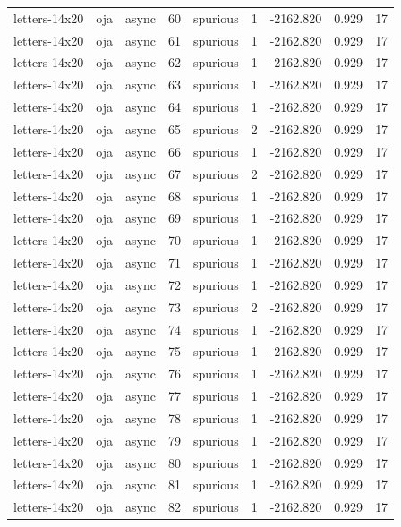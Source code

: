 \begin{tabular}{lllrlrrrr}
letters-14x20 & oja & async & 60 & spurious & 1 & -2162.820 & 0.929 & 17 \\
letters-14x20 & oja & async & 61 & spurious & 1 & -2162.820 & 0.929 & 17 \\
letters-14x20 & oja & async & 62 & spurious & 1 & -2162.820 & 0.929 & 17 \\
letters-14x20 & oja & async & 63 & spurious & 1 & -2162.820 & 0.929 & 17 \\
letters-14x20 & oja & async & 64 & spurious & 1 & -2162.820 & 0.929 & 17 \\
letters-14x20 & oja & async & 65 & spurious & 2 & -2162.820 & 0.929 & 17 \\
letters-14x20 & oja & async & 66 & spurious & 1 & -2162.820 & 0.929 & 17 \\
letters-14x20 & oja & async & 67 & spurious & 2 & -2162.820 & 0.929 & 17 \\
letters-14x20 & oja & async & 68 & spurious & 1 & -2162.820 & 0.929 & 17 \\
letters-14x20 & oja & async & 69 & spurious & 1 & -2162.820 & 0.929 & 17 \\
letters-14x20 & oja & async & 70 & spurious & 1 & -2162.820 & 0.929 & 17 \\
letters-14x20 & oja & async & 71 & spurious & 1 & -2162.820 & 0.929 & 17 \\
letters-14x20 & oja & async & 72 & spurious & 1 & -2162.820 & 0.929 & 17 \\
letters-14x20 & oja & async & 73 & spurious & 2 & -2162.820 & 0.929 & 17 \\
letters-14x20 & oja & async & 74 & spurious & 1 & -2162.820 & 0.929 & 17 \\
letters-14x20 & oja & async & 75 & spurious & 1 & -2162.820 & 0.929 & 17 \\
letters-14x20 & oja & async & 76 & spurious & 1 & -2162.820 & 0.929 & 17 \\
letters-14x20 & oja & async & 77 & spurious & 1 & -2162.820 & 0.929 & 17 \\
letters-14x20 & oja & async & 78 & spurious & 1 & -2162.820 & 0.929 & 17 \\
letters-14x20 & oja & async & 79 & spurious & 1 & -2162.820 & 0.929 & 17 \\
letters-14x20 & oja & async & 80 & spurious & 1 & -2162.820 & 0.929 & 17 \\
letters-14x20 & oja & async & 81 & spurious & 1 & -2162.820 & 0.929 & 17 \\
letters-14x20 & oja & async & 82 & spurious & 1 & -2162.820 & 0.929 & 17 \\

\end{tabular}
